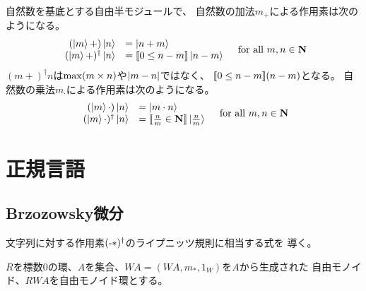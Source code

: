 	\begin{example}[自然数]\label{eg:自然数} %
		自然数を基底とする自由半モジュールで、
		自然数の加法$m_+$による作用素は次のようになる。
		\begin{equation*}\begin{split} %
			\begin{array}{rl}
				(\ket{m}+)\ket{n} &= \ket{n+m} \\
				(\ket{m}+)^\dag\ket{n} &= \jump{0\le n-m}\ket{n-m} \\
			\end{array}
			\quad\text{for all }m,n\in\mybf{N}
		\end{split}\end{equation*} %
		$(m+)^\dag n$は$\operatorname{max}(m\times n)$や$\left|{m-n}\right|$ではなく、
		$[\![0\le n-m]\!](n-m)$となる。
		自然数の乗法$m_\cdot$による作用素は次のようになる。
		\begin{equation*}\begin{split} %
			\begin{array}{rl}
				(\ket{m}\cdot)\ket{n} &= \ket{m\cdot n} \\
				(\ket{m}\cdot)^\dag\ket{n} 
				&= \jump{\frac{n}{m}\in\mybf{N}}\ket{\frac{n}{m}} \\
			\end{array}
			\quad\text{for all }m,n\in\mybf{N}
		\end{split}\end{equation*} %
	\end{example} %

\section{正規言語}\label{s1:正規言語} %
	\subsection{Brzozowsky微分}\label{s2:Brzozowsky微分} %
		文字列に対する作用素$(\myhere*)^\dag$のライプニッツ規則に相当する式を
		導く。

		$R$を標数$0$の環、$A$を集合、$WA=(WA,m_*,1_W)$を$A$から生成された
		自由モノイド、$RWA$を自由モノイド環とする。

